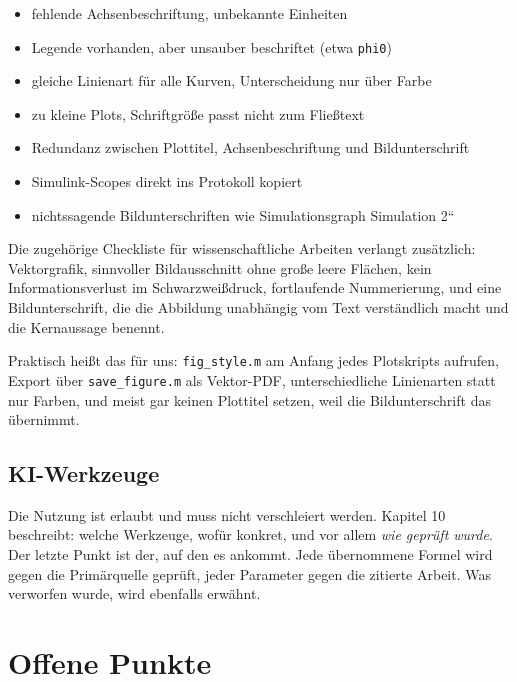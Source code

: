 \documentclass[11pt,a4paper]{scrartcl}
\providecommand{\glqq}{\quotedblbase}
\providecommand{\grqq}{\textquotedblleft}
\begin{document}
\begin{itemize}
  \item fehlende Achsenbeschriftung, unbekannte Einheiten
  \item Legende vorhanden, aber unsauber beschriftet (etwa \texttt{phi0})
  \item gleiche Linienart f\"ur alle Kurven, Unterscheidung nur \"uber Farbe
  \item zu kleine Plots, Schriftgr\"o{\ss}e passt nicht zum Flie{\ss}text
  \item Redundanz zwischen Plottitel, Achsenbeschriftung und Bildunterschrift
  \item Simulink-Scopes direkt ins Protokoll kopiert
  \item nichtssagende Bildunterschriften wie \glqq Simulationsgraph Simulation 2\grqq
\end{itemize}

Die zugeh\"orige Checkliste f\"ur wissenschaftliche Arbeiten verlangt
zus\"atzlich: Vektorgrafik, sinnvoller Bildausschnitt ohne gro{\ss}e leere
Fl\"achen, kein Informationsverlust im Schwarzwei{\ss}druck, fortlaufende
Nummerierung, und eine Bildunterschrift, die die Abbildung unabh\"angig vom
Text verst\"andlich macht und die Kernaussage benennt.

Praktisch hei{\ss}t das f\"ur uns: \texttt{fig\_style.m} am Anfang jedes
Plotskripts aufrufen, Export \"uber \texttt{save\_figure.m} als
Vektor-PDF, unterschiedliche Linienarten statt nur Farben, und meist gar
keinen Plottitel setzen, weil die Bildunterschrift das \"ubernimmt.

\subsection{KI-Werkzeuge}

Die Nutzung ist erlaubt und muss nicht verschleiert werden. Kapitel 10
beschreibt: welche Werkzeuge, wof\"ur konkret, und vor allem \emph{wie
gepr\"uft wurde}. Der letzte Punkt ist der, auf den es ankommt. Jede
\"ubernommene Formel wird gegen die Prim\"arquelle gepr\"uft, jeder Parameter
gegen die zitierte Arbeit. Was verworfen wurde, wird ebenfalls erw\"ahnt.

\section{Offene Punkte}
\end{document}
